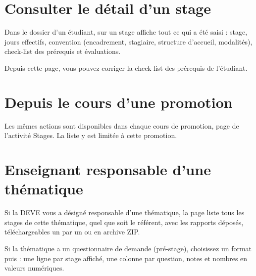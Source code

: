 \documentclass[11pt,a4paper]{article}
\begin{document}

\section{Consulter le détail d'un stage}

Dans le dossier d'un étudiant,  sur un stage affiche tout ce qui a été saisi : stage,
jours effectifs, convention (encadrement, stagiaire, structure d'accueil,
modalités), check-list des prérequis et évaluations.


Depuis cette page, vous pouvez corriger la check-list des prérequis de l'étudiant.

\section{Depuis le cours d'une promotion}

Les mêmes actions sont disponibles dans chaque cours de promotion, page
 de l'activité \og Stages\fg{}. La liste y est
limitée à cette promotion.


\section{Enseignant responsable d'une thématique}

Si la DEVE vous a désigné responsable d'une thématique, la page
 liste tous les stages de cette thématique, quel
que soit le référent, avec les rapports déposés, téléchargeables un par un ou en
archive ZIP.


Si la thématique a un questionnaire de demande (pré-stage), choisissez un format
puis  : une ligne par stage affiché, une colonne par
question, notes et nombres en valeurs numériques.

\end{document}
